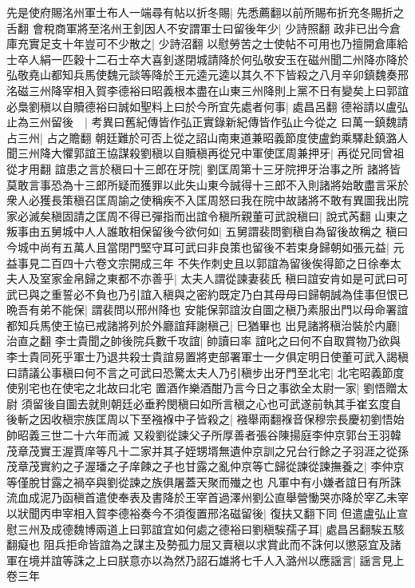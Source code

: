 先是使府賜洺州軍士布人一端尋有帖以折冬賜|{
	先悉薦翻以前所賜布折充冬賜折之舌翻}
會稅商軍將至洺州王釗因人不安謂軍士曰留後年少|{
	少詩照翻}
政非已出今倉庫充實足支十年豈可不少散之|{
	少詩沼翻}
以慰勞苦之士使帖不可用也乃擅開倉庫給士卒人絹一匹穀十二石士卒大喜釗遂閉城請降於何弘敬安玉在磁州聞二州降亦降於弘敬堯山都知兵馬使魏元談等降於王元逵元逵以其久不下皆殺之八月辛卯鎮魏奏邢洺磁三州降宰相入賀李德裕曰昭義根本盡在山東三州降則上黨不日有變矣上曰郭誼必梟劉稹以自贖德裕曰誠如聖料上曰於今所宜先處者何事|{
	處昌呂翻}
德裕請以盧弘止為三州留後　|{
	考異曰舊紀傳皆作弘正實錄新紀傳皆作弘止今從之}
曰萬一鎮魏請占三州|{
	占之贍翻}
朝廷難於可否上從之詔山南東道兼昭義節度使盧鈞乘驛赴鎮潞人聞三州降大懼郭誼王協謀殺劉稹以自贖稹再從兄中軍使匡周兼押牙|{
	再從兄同曾祖從才用翻}
誼患之言於稹曰十三郎在牙院|{
	劉匡周第十三牙院押牙治事之所}
諸將皆莫敢言事恐為十三郎所疑而獲罪以此失山東今誠得十三郎不入則諸將始敢盡言采於衆人必獲長策稹召匡周諭之使稱疾不入匡周怒曰我在院中故諸將不敢有異圖我出院家必滅矣稹固請之匡周不得已彈指而出誼令稹所親董可武說稹曰|{
	說式芮翻}
山東之叛事由五舅城中人人誰敢相保留後今欲何如|{
	五舅謂裴問劉稹自為留後故稱之}
稹曰今城中尚有五萬人且當閉門堅守耳可武曰非良策也留後不若束身歸朝如張元益|{
	元益事見二百四十六卷文宗開成三年}
不失作刺史且以郭誼為留後俟得節之日徐奉太夫人及室家金帛歸之東都不亦善乎|{
	太夫人謂從諫妻裴氏}
稹曰誼安肯如是可武曰可武已與之重誓必不負也乃引誼入稹與之密約既定乃白其母母曰歸朝誠為佳事但恨已晩吾有弟不能保|{
	謂裴問以邢州降也}
安能保郭誼汝自圖之稹乃素服出門以母命署誼都知兵馬使王協已戒諸將列於外廳誼拜謝稹己|{
	巳猶畢也}
出見諸將稹治裝於内廳|{
	治直之翻}
李士貴聞之帥後院兵數千攻誼|{
	帥讀曰率}
誼叱之曰何不自取賞物乃欲與李士貴同死乎軍士乃退共殺士貴誼易置將吏部署軍士一夕俱定明日使董可武入謁稹曰請議公事稹曰何不言之可武曰恐驚太夫人乃引稹步出牙門至北宅|{
	北宅昭義節度使别宅也在使宅之北故曰北宅}
置酒作樂酒酣乃言今日之事欲全太尉一家|{
	劉悟贈太尉}
須留後自圖去就則朝廷必垂矜閔稹曰如所言稹之心也可武遂前執其手崔玄度自後斬之因收稹宗族匡周以下至襁褓中子皆殺之|{
	襁舉兩翻褓音保穆宗長慶初劉悟始帥昭義三世二十六年而滅}
又殺劉從諫父子所厚善者張谷陳揚庭李仲京郭台王羽韓茂章茂實王渥賈庠等凡十二家并其子姪甥壻無遺仲京訓之兄台行餘之子羽涯之從孫茂章茂實約之子渥璠之子庠餗之子也甘露之亂仲京等亡歸從諫從諫撫養之|{
	李仲京等僅脫甘露之禍卒與劉從諫之族俱屠蓋天聚而殱之也}
凡軍中有小嫌者誼日有所誅流血成泥乃函稹首遣使奉表及書降於王宰首過澤州劉公直舉營慟哭亦降於宰乙未宰以狀聞丙申宰相入賀李德裕奏今不須復置邢洺磁留後|{
	復扶又翻下同}
但遣盧弘止宣慰三州及成德魏博兩道上曰郭誼宜如何處之德裕曰劉稹騃孺子耳|{
	處昌呂翻騃五駭翻癡也}
阻兵拒命皆誼為之謀主及勢孤力屈又賣稹以求賞此而不誅何以懲惡宜及諸軍在境并誼等誅之上曰朕意亦以為然乃詔石雄將七千人入潞州以應謡言|{
	謡言見上卷三年}
